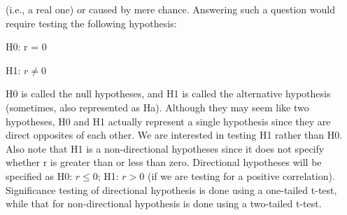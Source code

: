 (i.e., a real one) or caused by mere chance. Answering such a question would require testing the following hypothesis:

H0: r = 0

H1: $ r \neq 0 $

H0 is called the null hypotheses, and H1 is called the alternative hypothesis (sometimes, also represented as Ha). Although they may seem like two hypotheses, H0 and H1 actually represent a single hypothesis since they are direct opposites of each other. We are interested in testing H1 rather than H0. Also note that H1 is a non-directional hypotheses since it does not specify whether r is greater than or less than zero. Directional hypotheses will be specified as H0: $ r \leq 0 $; H1: $ r > 0 $ (if we are testing for a positive correlation). Significance testing of directional hypothesis is done using a one-tailed t-test, while that for non-directional hypothesis is done using a two-tailed t-test.

